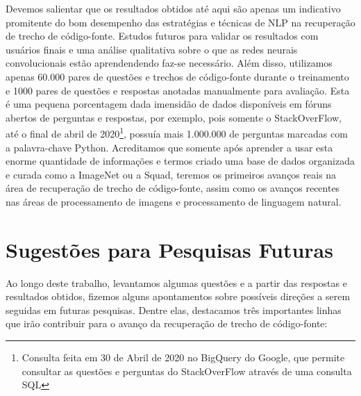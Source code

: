Devemos salientar que os resultados obtidos até aqui são apenas um indicativo promitente do bom desempenho das estratégias e técnicas de NLP na recuperação de trecho de código-fonte. Estudos futuros para validar os resultados com usuários finais e uma análise qualitativa sobre o que as redes neurais convolucionais estão aprendendendo faz-se necessário. Além disso, utilizamos apenas 60.000 pares de questões e trechos de código-fonte durante o treinamento e 1000 pares de questões e respostas anotadas manualmente para avaliação. Esta é uma pequena porcentagem dada imensidão de dados disponíveis em fóruns abertos de perguntas e respostas, por exemplo, pois somente o StackOverFlow, até o final de abril de 2020\footnote{Consulta feita em 30 de Abril de 2020 no BigQuery do Google, que permite consultar as questões e perguntas do StackOverFlow através de uma consulta SQL}, possuía mais 1.000.000 de perguntas marcadas com a palavra-chave Python. Acreditamos que somente após aprender a usar esta enorme quantidade de informações e termos criado uma base de dados organizada e curada como a ImageNet ou a Squad, teremos os primeiros avanços reais na área de recuperação de trecho de código-fonte, assim como os avanços recentes nas áreas de processamento de imagens e processamento de linguagem natural.



\section{Sugestões para Pesquisas Futuras} 

Ao longo deste trabalho, levantamos algumas questões e a partir das respostas e resultados obtidos, fizemos alguns apontamentos sobre possíveis direções a serem seguidas em futuras pesquisas. Dentre elas, destacamos três importantes linhas que irão contribuir para o avanço da recuperação de trecho de código-fonte:


